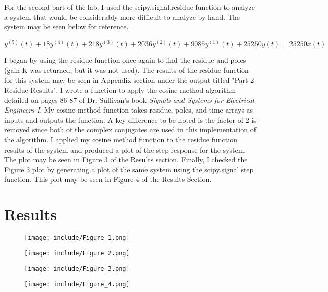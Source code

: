 \documentclass[12pt]{article}
\begin{document}
    \par For the second part of the lab, I used the scipy.signal.residue function to analyze a system that would be considerably more difficult to analyze by hand. The system may be seen below for reference.
    
    $$ y^{(5)}(t) + 18y^{(4)}(t) + 218y^{(3)}(t) + 2036y^{(2)}(t) + 9085y^{(1)}(t) + 25250y(t) = 25250x(t) $$
    
    I began by using the residue function once again to find the residue and poles (gain K was returned, but it was not used). The results of the residue function for this system may be seen in Appendix section under the output titled "Part 2 Residue Results". I wrote a function to apply the cosine method algorithm detailed on pages 86-87 of Dr. Sullivan's book \emph{Signals and Systems for Electrical Engineers I}. My cosine method function takes residue, poles, and time arrays as inputs and outputs the function. A key difference to be noted is the factor of 2 is removed since both of the complex conjugates are used in this implementation of the algorithm. I applied my cosine method function to the residue function results of the system and produced a plot of the step response for the system. The plot may be seen in Figure 3 of the Results section. Finally, I checked the Figure 3 plot by generating a plot of the same system using the scipy.signal.step function. This plot may be seen in Figure 4 of the Results Section.
    
\newpage
\section{Results}
    \begin{figure}[hbt!]
        \centering
        \texttt{[image: include/Figure\_1.png]}
        \caption{}
    \end{figure}
    
    \begin{figure}
        \centering
        \texttt{[image: include/Figure\_2.png]}
        \caption{}
    \end{figure}
    
    \begin{figure}
        \centering
        \texttt{[image: include/Figure\_3.png]}
        \caption{}
    \end{figure}
    
    \begin{figure}
        \centering
        \texttt{[image: include/Figure\_4.png]}
        \caption{}
    \end{figure}
    
\end{document}
